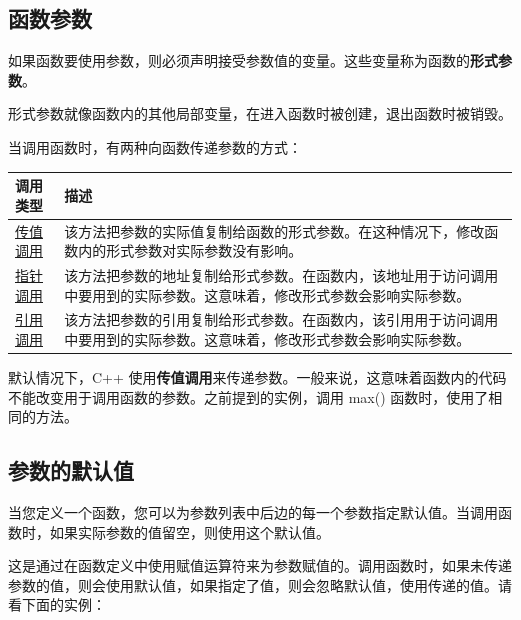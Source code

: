 \documentclass[
]{article}
\begin{document}
\hypertarget{ux51fdux6570ux53c2ux6570}{%
\subsection{函数参数}\label{ux51fdux6570ux53c2ux6570}}

如果函数要使用参数，则必须声明接受参数值的变量。这些变量称为函数的\textbf{形式参数}。

形式参数就像函数内的其他局部变量，在进入函数时被创建，退出函数时被销毁。

当调用函数时，有两种向函数传递参数的方式：

\begin{longtable}[]{@{}ll@{}}
\toprule
调用类型 & 描述 \\
\midrule
\endhead
\href{https://edu.aliyun.com/cplusplus/cpp-function-call-by-value.html}{传值调用}
&
该方法把参数的实际值复制给函数的形式参数。在这种情况下，修改函数内的形式参数对实际参数没有影响。 \\
\href{https://edu.aliyun.com/cplusplus/cpp-function-call-by-pointer.html}{指针调用}
&
该方法把参数的地址复制给形式参数。在函数内，该地址用于访问调用中要用到的实际参数。这意味着，修改形式参数会影响实际参数。 \\
\href{https://edu.aliyun.com/cplusplus/cpp-function-call-by-reference.html}{引用调用}
&
该方法把参数的引用复制给形式参数。在函数内，该引用用于访问调用中要用到的实际参数。这意味着，修改形式参数会影响实际参数。 \\
\bottomrule
\end{longtable}

默认情况下，C++
使用\textbf{传值调用}来传递参数。一般来说，这意味着函数内的代码不能改变用于调用函数的参数。之前提到的实例，调用
max() 函数时，使用了相同的方法。

\hypertarget{ux53c2ux6570ux7684ux9ed8ux8ba4ux503c}{%
\subsection{参数的默认值}\label{ux53c2ux6570ux7684ux9ed8ux8ba4ux503c}}

当您定义一个函数，您可以为参数列表中后边的每一个参数指定默认值。当调用函数时，如果实际参数的值留空，则使用这个默认值。

这是通过在函数定义中使用赋值运算符来为参数赋值的。调用函数时，如果未传递参数的值，则会使用默认值，如果指定了值，则会忽略默认值，使用传递的值。请看下面的实例：
\end{document}
